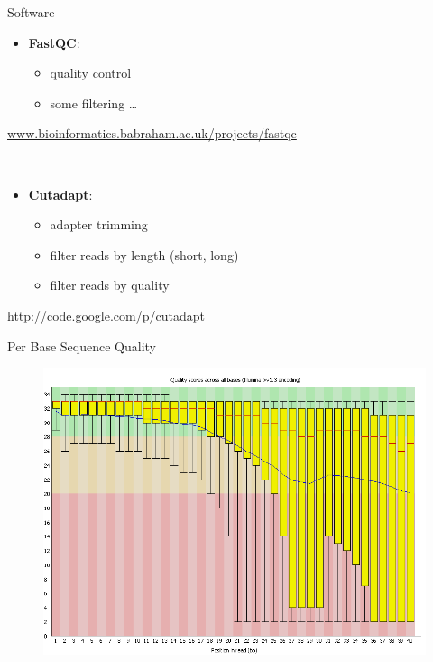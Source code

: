 \begin{frame}{Software}

\begin{itemize}
\itemsep1pt\parskip0pt
\item
  \textbf{FastQC}:

  \begin{itemize}
  \itemsep1pt\parskip0pt
  \item
    quality control
  \item
    some filtering \ldots{}
  \end{itemize}
\end{itemize}

\href{http://www.bioinformatics.babraham.ac.uk/projects/fastqc}{www.bioinformatics.babraham.ac.uk/projects/fastqc}

~

\begin{itemize}
\itemsep1pt\parskip0pt
\item
  \textbf{Cutadapt}:

  \begin{itemize}
  \itemsep1pt\parskip0pt
  \item
    adapter trimming
  \item
    filter reads by length (short, long)
  \item
    filter reads by quality
  \end{itemize}
\end{itemize}

\url{http://code.google.com/p/cutadapt}

\end{frame}

\begin{frame}{Per Base Sequence Quality}

\begin{figure}[htbp]
\centering
\includegraphics[width=\textwidth,height=0.8\textheight,keepaspectratio]{images/per_base_quality}
\end{figure}

\end{frame}

